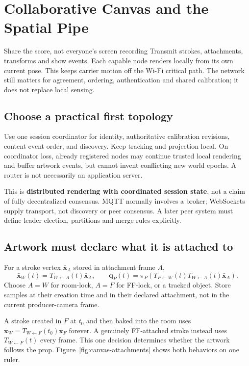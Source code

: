 \documentclass[11pt,a4paper]{article}
\newcommand{\T}[2]{T_{#1\leftarrow #2}}
\newcommand{\hpt}[1]{\bar{\bm{x}}_{#1}}
\begin{document}
\section{Collaborative Canvas and the Spatial Pipe}
\label{sec:pipe}

\begin{plain}{Share the score, not everyone's screen recording}
Transmit strokes, attachments, transforms and show events.
Each capable node renders locally from its own current pose.
This keeps carrier motion off the Wi-Fi critical path.
The network still matters for agreement, ordering, authentication and
shared calibration; it does not replace local sensing.
\end{plain}

\subsection{Choose a practical first topology}
Use one session coordinator for identity, authoritative calibration revisions,
content event order, and discovery. Keep tracking and projection local.
On coordinator loss, already registered nodes may continue trusted local
rendering and buffer artwork events, but cannot invent conflicting new
world epochs. A router is not necessarily an application server.

This is \textbf{distributed rendering with coordinated session state}, not a
claim of fully decentralized consensus. MQTT normally involves a broker;
WebSockets supply transport, not discovery or peer consensus. A later peer
system must define leader election, partitions and merge rules explicitly.

\subsection{Artwork must declare what it is attached to}
For a stroke vertex $\hpt{A}$ stored in attachment frame $A$,
\begin{equation}
\hpt{W}(t)=\T{W}{A}(t)\hpt{A},\qquad
\bm{q}_{P}(t)=
\pi_P\!\left(\T{P}{W}(t)\T{W}{A}(t)\hpt{A}\right).
\label{eq:canvas}
\end{equation}
Choose $A=W$ for room-lock, $A=F$ for FF-lock, or a tracked object.
Store samples at their creation time and in their declared attachment,
not in the current producer-camera frame.

A stroke created in $F$ at $t_0$ and then baked into the room uses
$\hpt{W}=\T{W}{F}(t_0)\hpt{F}$ forever.
A genuinely FF-attached stroke instead uses $\T{W}{F}(t)$ every frame.
This one decision determines whether the artwork follows the prop.
Figure~\ref{fig:canvas-attachments} shows both behaviors on one ruler.
\end{document}
